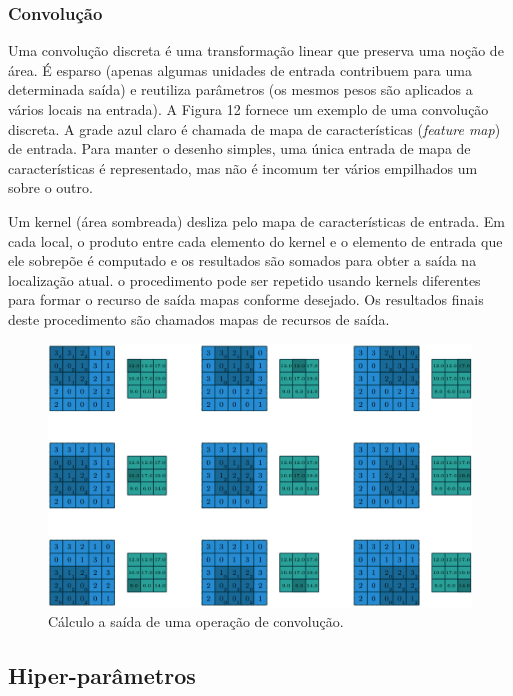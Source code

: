 \documentclass[12pt]{article}
\begin{document}
\subsubsection{Convolução}

Uma convolução discreta é uma transformação linear que preserva uma noção de área. É esparso (apenas algumas unidades de entrada contribuem para uma determinada saída) e reutiliza parâmetros (os mesmos pesos são aplicados a vários locais na entrada). A Figura 12 fornece um exemplo de uma convolução discreta. A grade azul claro é chamada de mapa de características (\textit{feature map}) de entrada. Para manter o desenho simples, uma única entrada de mapa de características é representado, mas não é incomum ter vários empilhados um sobre o outro.

Um kernel (área sombreada) desliza pelo mapa de características de entrada. Em cada local, o produto entre cada elemento do kernel e o elemento de entrada que ele sobrepõe é computado e os resultados são somados para obter a saída na localização atual. o procedimento pode ser repetido usando kernels diferentes para formar o recurso de saída mapas conforme desejado. Os resultados finais deste procedimento são chamados mapas de recursos de saída. \cite{dumoulin2016guide}

\begin{figure}[!htb]
\centering
\includegraphics[width=.9\textwidth]{images/convolutions.png}
\caption{Cálculo a saída de uma operação de convolução. \cite{dumoulin2016guide}}
\label{fig:graph}
\end{figure}

\subsection{Hiper-parâmetros}
\end{document}
